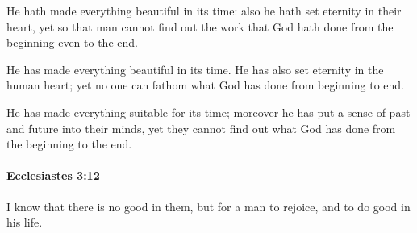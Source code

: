 			\begin{versebox}
					\item[BHS] 
					\item[LXX] 
					\item[ASV] He hath made everything beautiful in its time: also he hath set eternity in their heart, yet so that man cannot find out the work that God hath done from the beginning even to the end.
					\item[NIV] He has made everything beautiful in its time. He has also set eternity in the human heart; yet no one can fathom what God has done from beginning to end.
					\item[NRSV] He has made everything suitable for its time; moreover he has put a sense of past and future into their minds, yet they cannot find out what God has done from the beginning to the end.
			\end{versebox}

		\paragraph{Ecclesiastes 3:12} %
			\label{ECCLESIASTES-3-12}

			I know that there is no good in them, but for a man to rejoice, and to do good in his life.

